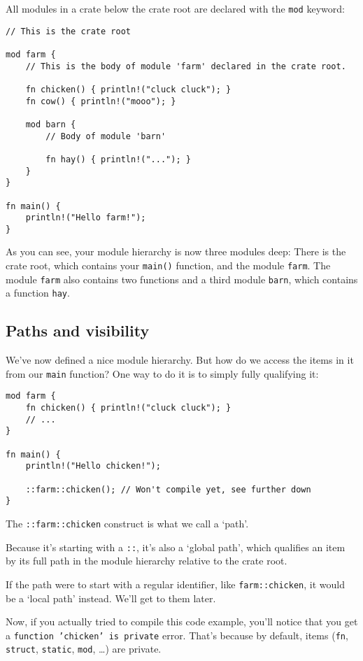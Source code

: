 \documentclass[]{article}
\begin{document}
All modules in a crate below the crate root are declared with the
\texttt{mod} keyword:

\begin{verbatim}
// This is the crate root

mod farm {
    // This is the body of module 'farm' declared in the crate root.

    fn chicken() { println!("cluck cluck"); }
    fn cow() { println!("mooo"); }

    mod barn {
        // Body of module 'barn'

        fn hay() { println!("..."); }
    }
}

fn main() {
    println!("Hello farm!");
}
\end{verbatim}

As you can see, your module hierarchy is now three modules deep: There
is the crate root, which contains your \texttt{main()} function, and the
module \texttt{farm}. The module \texttt{farm} also contains two
functions and a third module \texttt{barn}, which contains a function
\texttt{hay}.

\subsection{Paths and visibility}\label{paths-and-visibility}

We've now defined a nice module hierarchy. But how do we access the
items in it from our \texttt{main} function? One way to do it is to
simply fully qualifying it:

\begin{verbatim}
mod farm {
    fn chicken() { println!("cluck cluck"); }
    // ...
}

fn main() {
    println!("Hello chicken!");

    ::farm::chicken(); // Won't compile yet, see further down
}
\end{verbatim}

The \texttt{::farm::chicken} construct is what we call a `path'.

Because it's starting with a \texttt{::}, it's also a `global path',
which qualifies an item by its full path in the module hierarchy
relative to the crate root.

If the path were to start with a regular identifier, like
\texttt{farm::chicken}, it would be a `local path' instead. We'll get to
them later.

Now, if you actually tried to compile this code example, you'll notice
that you get a \texttt{function 'chicken' is private} error. That's
because by default, items (\texttt{fn}, \texttt{struct},
\texttt{static}, \texttt{mod}, \ldots{}) are private.
\end{document}
